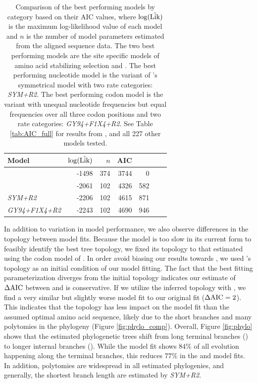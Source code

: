 \documentclass[fleqn,letterpaper]{article}
\begin{document}
\begin{table}
  \centering
  \caption{Comparison of the best performing models by category based on their AIC values, where  $\log(\hat{\text{Lik}})$ is the maximum log-likelihood value of each model and $n$ is the number of model parameters estimated from the aligned sequence data.
    The two best performing models are the site specific models of amino acid stabilizing selection \selac and \phydms.
    The best performing nucleotide model is the variant of \citet{zharkikh1994}'s symmetrical model with two rate categories: \emph{SYM+R2}. 
    The best performing codon model is the \gy variant with unequal nucleotide frequencies but equal frequencies over all three codon positions and two rate categories: \emph{GY94+F1X4+R2}.    
  See Table \ref{tab:AIC_full} for results from \selac, \phydms and all 227 other models tested.
}  
  \begin{tabular}{lrrrrrr}
    \hline
    Model							& $\log(\hat{\text{Lik}})$ & $n$ & AIC & \DeltaAIC \\ \hline 
    \selac							& -1498 & 374 & 3744 &  0 \\
    \phydms 						& -2061 & 102 & 4326 & 582 \\
    \emph{SYM+R2} 				& -2206 & 102 & 4615 & 871 \\
    \emph{GY94+F1X4+R2} 		& -2243 & 102 & 4690 & 946 \\ \hline
  \end{tabular}
  \label{tab:AIC_selac}
\end{table}


In addition to variation in model performance, we also observe differences in the topology between model fits.
Because the \selac model is too slow in its current form to feasibly identify the best tree topology, we fixed its topology to that estimated using the codon model of \citet{KosiolEtAl07}.
In order avoid biasing our results towards \selac, we used \selac's topology as an initial condition of our \phydms model fitting.
The fact that the best fitting \phydms parameterization diverges from the initial topology indicates our estimate of $\Delta\text{AIC}$ between \selac and \phydms is conservative.
If we utilize the \phydms inferred topology with \selac, we find a very similar but slightly worse model fit to our original \selac fit ($\Delta\text{AIC} = 2$).
This indicates that the topology has less impact on the model fit than the assumed optimal amino acid sequence, likely due to the short branches and many polytomies in the phylogeny (Figure \ref{fig:phylo_comp}).
Overall, Figure \ref{fig:phylo} shows that the estimated phylogenetic trees shift from long terminal branches (\selac) to longer internal branches (\phydms).
While the \selac model fit shows $84 \%$ of all evolution happening along the terminal branches, this reduces $77 \%$ in the \phydms and \gy model fits.
In addition, polytomies are widespread in all estimated phylogenies, and generally, the shortest branch length are estimated by \emph{SYM+R2}.
\end{document}
